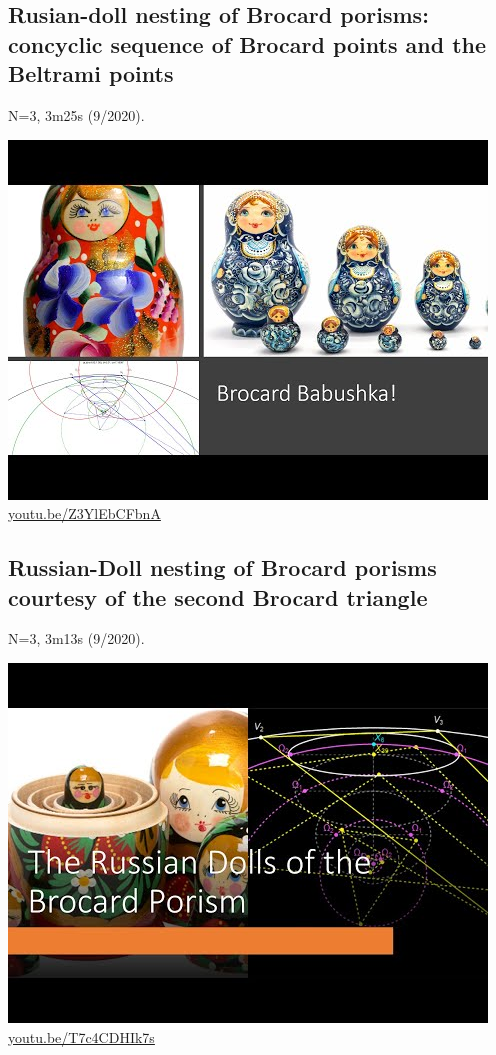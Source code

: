 \documentclass[12pt]{amsart}
\begin{document}
\subsection{Rusian-doll nesting of Brocard porisms: concyclic sequence of Brocard points and the Beltrami points}
\label{vid:Z3YlEbCFbnA}
\noindent N=3, 3m25s (9/2020). 
\begin{center}\includegraphics[width=.5\textwidth]{pics/Z3YlEbCFbnA.jpg} \\ 
\href{https://youtu.be/Z3YlEbCFbnA}{\url{youtu.be/Z3YlEbCFbnA}}\end{center}
% 

\subsection{Russian-Doll nesting of Brocard porisms courtesy of the second Brocard triangle}
\label{vid:T7c4CDHIk7s}
\noindent N=3, 3m13s (9/2020). 
\begin{center}\includegraphics[width=.5\textwidth]{pics/T7c4CDHIk7s.jpg} \\ 
\href{https://youtu.be/T7c4CDHIk7s}{\url{youtu.be/T7c4CDHIk7s}}\end{center}
% 
\end{document}
